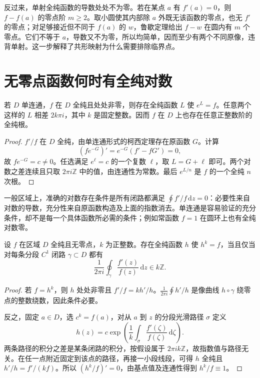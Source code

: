 反过来，单射全纯函数的导数处处不为零。若在某点 $a$ 有 $f'(a)=0$，则 $f-f(a)$ 的零点阶 $m\ge2$。取小圆使其内部除 $a$ 外既无该函数的零点，也无 $f'$ 的零点；对足够接近但不同于 $f(a)$ 的 $w$，鲁歇定理给出 $f-w$ 在圆内有 $m$ 个零点。它们不等于 $a$，导数又不为零，所以均简单，因而至少有两个不同原像，违背单射。这一步解释了共形映射为什么需要排除临界点。

\section{无零点函数何时有全纯对数}

\begin{theorem}[单连通区域上的全纯对数]
\label{thm:ca-holomorphic-log}
若 $D$ 单连通，$f$ 在 $D$ 全纯且处处非零，则存在全纯函数 $L$ 使 $e^L=f$。任意两个这样的 $L$ 相差 $2k\pi i$，其中 $k$ 是固定整数。因而 $f$ 在 $D$ 上也存在任意正整数阶的全纯根。
\end{theorem}
\begin{proof}
$f'/f$ 在 $D$ 全纯，由单连通形式的柯西定理存在原函数 $G$。计算
\[
 (fe^{-G})'=e^{-G}(f'-fG')=0,
\]
故 $fe^{-G}=c\ne0$。任选满足 $e^\ell=c$ 的一个复数 $\ell$，取 $L=G+\ell$ 即可。两个对数之差连续且只取 $2\pi i\mathbb Z$ 中的值，由连通性为常数。最后 $e^{L/n}$ 是 $f$ 的一个全纯 $n$ 次根。
\end{proof}

一般区域上，准确的对数存在条件是所有闭路都满足 $\oint f'/f\,\mathrm dz=0$：必要性来自对数的导数，充分性来自原函数构造及上面的指数消去。单连通是容易验证的充分条件，却不是每一个具体函数所必需的条件；例如常函数 $f=1$ 在圆环上也有全纯对数零。

\begin{proposition}[全纯根的周期判据]
\label{prop:ca-root-periods}
设 $f$ 在区域 $D$ 全纯且无零点，$k$ 为正整数。存在全纯函数 $h$ 使 $h^k=f$，当且仅当对每条分段 $C^1$ 闭路 $\gamma\subset D$ 都有
\[
 \frac1{2\pi i}\oint_\gamma\frac{f'(z)}{f(z)}\,\mathrm dz\in k\mathbb Z.
\]
\end{proposition}
\begin{proof}
若 $f=h^k$，则 $h$ 处处非零且 $f'/f=k h'/h$。$\frac1{2\pi i}\oint h'/h$ 是像曲线 $h\circ\gamma$ 绕零点的整数绕数，因此条件必要。

反之，固定 $a\in D$，选 $c^k=f(a)$，对从 $a$ 到 $z$ 的分段光滑路径 $\sigma$ 定义
\[
 h(z)=c\exp\left(\frac1k\int_\sigma\frac{f'(\zeta)}{f(\zeta)}\,\mathrm d\zeta\right).
\]
两条路径的积分之差是某条闭路的积分，按假设属于 $2\pi i k\mathbb Z$，故指数值与路径无关。在任一点附近固定到该点的路径，再接一小段线段，可得 $h$ 全纯且 $h'/h=f'/(kf)$。所以 $(h^k/f)'=0$，由基点值及连通性得到 $h^k/f\equiv1$。
\end{proof}


